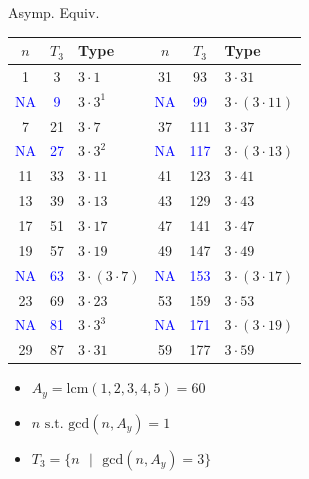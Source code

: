 \documentclass{beamer}
\begin{document}
\begin{frame}{Asymp. Equiv.}
\begin{center}
\begin{table}[]
    \centering
    \begin{tabular}{| c | c | l || c | c | l|}
\hline
 $n$ & $T_3$ & Type & $n$ & $T_3$ & Type \\
 \hline
1                       & 3                     & $3 \cdot 1$           & 31                      & 93                      & $3 \cdot 31$\\
\textcolor{blue}{NA}    & \textcolor{blue}{9}   & $3 \cdot 3^1$         & \textcolor{blue}{NA}    & \textcolor{blue}{99}    & $3 \cdot (3 \cdot 11)$\\
7                       & 21                    & $3 \cdot 7$           & 37                      & 111                     & $3 \cdot 37$\\
\textcolor{blue}{NA}    & \textcolor{blue}{27}  & $3 \cdot 3^2$         & \textcolor{blue}{NA}    & \textcolor{blue}{117}   & $3 \cdot (3 \cdot 13)$\\
11                      & 33                    & $3 \cdot 11$          & 41                      & 123                     & $3 \cdot 41$\\
13                      & 39                    & $3 \cdot 13$          & 43                      & 129                     & $3 \cdot 43$\\
17                      & 51                    & $3 \cdot 17$          & 47                      & 141                     & $3 \cdot 47$\\
19                      & 57                    & $3 \cdot 19$          & 49                      & 147                     & $3 \cdot 49$\\
\textcolor{blue}{NA}    & \textcolor{blue}{63}  & $3 \cdot (3 \cdot 7)$ & \textcolor{blue}{NA}    & \textcolor{blue}{153}   & $3 \cdot (3 \cdot 17)$\\
23                      & 69                    & $3 \cdot 23$          & 53                      & 159                     & $3 \cdot 53$\\
\textcolor{blue}{NA}    & \textcolor{blue}{81}  & $3 \cdot 3^3$          & \textcolor{blue}{NA}    & \textcolor{blue}{171}   & $3 \cdot (3 \cdot 19)$\\
29                      & 87                    & $3 \cdot 31$          & 59                      & 177                     & $3 \cdot 59$\\


\hline
\end{tabular}
\end{table}

\end{center}
\begin{itemize}
    \item $A_y = \text{lcm}(1,2,3,4,5) = 60$ 
    \item $n \text{ s.t. gcd}(n, A_y) = 1$ 
    \item $T_3 = \{n \text{ }| \text{ }\text{gcd}(n, A_y) = 3\}$
\end{itemize}
    

\end{frame}
\end{document}
